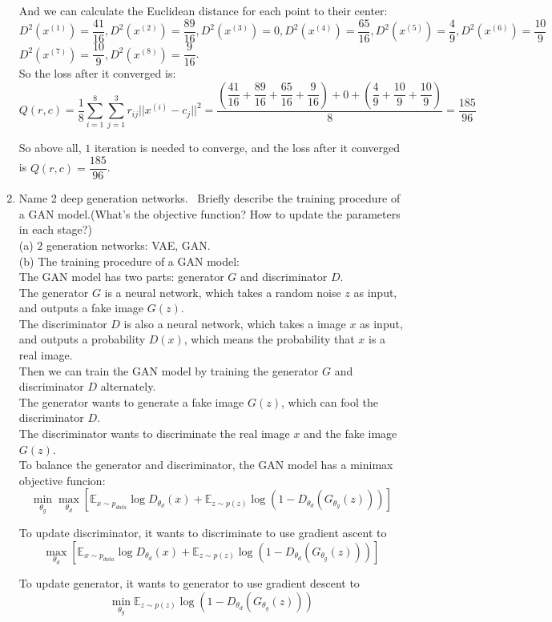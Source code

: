 \documentclass[10pt]{article}
\begin{document}
\begin{enumerate}[1.]
And we can calculate the Euclidean distance for each point to their center:\\
$D^2(x^{(1)})=\dfrac{41}{16},D^2(x^{(2)})=\dfrac{89}{16},D^2(x^{(3)})=0,D^2(x^{(4)})=\dfrac{65}{16},D^2(x^{(5)})=\dfrac{4}{9},D^2(x^{(6)})=\dfrac{10}{9}$\\

$D^2(x^{(7)})=\dfrac{10}{9},D^2(x^{(8)})=\dfrac{9}{16}$.\\

So the loss after it converged is:
$$Q(r,c)=\dfrac{1}{8}\sum\limits_{i=1}^8\sum\limits_{j=1}^3r_{ij}||x^{(i)}-c_j||^2=\dfrac{(\dfrac{41}{16}+\dfrac{89}{16}+\dfrac{65}{16}+\dfrac{9}{16})+0+(\dfrac{4}{9}+\dfrac{10}{9}+\dfrac{10}{9})}{8}=\dfrac{185}{96}$$
		 
So above all, $1$ iteration is needed to converge, and the loss after it converged is $Q(r,c)=\dfrac{185}{96}$.\\		 
		 
		\newpage


	\item {} Name 2 deep generation networks.~ Briefly describe the training procedure of a GAN model.(What's the objective function? How to update the parameters in each stage?)~\\
(a) $2$ generation networks: VAE, GAN.\\

(b) The training procedure of a GAN model:\\
The GAN model has two parts: generator $G$ and discriminator $D$.\\
The generator $G$ is a neural network, which takes a random noise $z$ as input, and outputs a fake image $G(z)$.\\
The discriminator $D$ is also a neural network, which takes a image $x$ as input, and outputs a probability $D(x)$, which means the probability that $x$ is a real image.\\
Then we can train the GAN model by training the generator $G$ and discriminator $D$ alternately.\\
The generator wants to generate a fake image $G(z)$, which can fool the discriminator $D$.\\
The discriminator wants to discriminate the real image $x$ and the fake image $G(z)$.\\

To balance the generator and discriminator, the GAN model has a minimax objective funcion:
$$\min_{\theta_g}\max_{\theta_d}\left[\mathbb{E}_{x\sim p_{data}}\log D_{\theta_d}(x)+\mathbb{E}_{z\sim p(z)}\log (1-D_{\theta_d}(G_{\theta_{g}}(z)))\right]$$
	
To update discriminator, it wants to discriminate to use gradient ascent to 
$$\max_{\theta_d}\left[\mathbb{E}_{x\sim p_{data}}\log D_{\theta_d}(x)+\mathbb{E}_{z\sim p(z)}\log (1-D_{\theta_d}(G_{\theta_{g}}(z)))\right]$$

To update generator, it wants to generator to use gradient descent to 
$$\min_{\theta_g}\mathbb{E}_{z\sim p(z)}\log (1-D_{\theta_d}(G_{\theta_{g}}(z)))$$



\end{enumerate}
\end{document}
